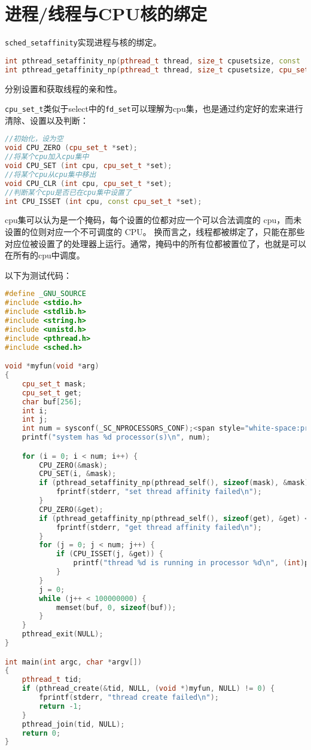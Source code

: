  
\section{进程/线程与CPU核的绑定}
\verb$sched_setaffinity$实现进程与核的绑定。

\begin{lstlisting}[language=C++]
int pthread_setaffinity_np(pthread_t thread, size_t cpusetsize, const  cpu_set_t *cpuset);
int pthread_getaffinity_np(pthread_t thread, size_t cpusetsize, cpu_set_t  *cpuset);
\end{lstlisting}
分别设置和获取线程的亲和性。

\verb$cpu_set_t$类似于select中的\verb$fd_set$可以理解为cpu集，也是通过约定好的宏来进行清除、设置以及判断：
\begin{lstlisting}[language=C++]
//初始化，设为空
void CPU_ZERO (cpu_set_t *set); 
//将某个cpu加入cpu集中 
void CPU_SET (int cpu, cpu_set_t *set); 
//将某个cpu从cpu集中移出 
void CPU_CLR (int cpu, cpu_set_t *set); 
//判断某个cpu是否已在cpu集中设置了 
int CPU_ISSET (int cpu, const cpu_set_t *set); 
\end{lstlisting}

cpu集可以认为是一个掩码，每个设置的位都对应一个可以合法调度的 cpu，而未设置的位则对应一个不可调度的 CPU。
换而言之，线程都被绑定了，只能在那些对应位被设置了的处理器上运行。通常，掩码中的所有位都被置位了，也就是可以在所有的cpu中调度。       
      
以下为测试代码：

\begin{lstlisting}[language=C++]
#define _GNU_SOURCE
#include <stdio.h>
#include <stdlib.h>
#include <string.h>
#include <unistd.h>
#include <pthread.h>
#include <sched.h>

void *myfun(void *arg)
{
    cpu_set_t mask;
    cpu_set_t get;
    char buf[256];
    int i;
    int j;
    int num = sysconf(_SC_NPROCESSORS_CONF);<span style="white-space:pre">	</span>//统计cpu个数
    printf("system has %d processor(s)\n", num);

    for (i = 0; i < num; i++) {
        CPU_ZERO(&mask);
        CPU_SET(i, &mask);
        if (pthread_setaffinity_np(pthread_self(), sizeof(mask), &mask) < 0) {
            fprintf(stderr, "set thread affinity failed\n");
        }
        CPU_ZERO(&get);
        if (pthread_getaffinity_np(pthread_self(), sizeof(get), &get) < 0) {
            fprintf(stderr, "get thread affinity failed\n");
        }
        for (j = 0; j < num; j++) {
            if (CPU_ISSET(j, &get)) {
                printf("thread %d is running in processor %d\n", (int)pthread_self(), j);
            }
        }
        j = 0;
        while (j++ < 100000000) {
            memset(buf, 0, sizeof(buf));
        }
    }
    pthread_exit(NULL);
}

int main(int argc, char *argv[])
{
    pthread_t tid;
    if (pthread_create(&tid, NULL, (void *)myfun, NULL) != 0) {
        fprintf(stderr, "thread create failed\n");
        return -1;
    }
    pthread_join(tid, NULL);
    return 0;
}
\end{lstlisting}





